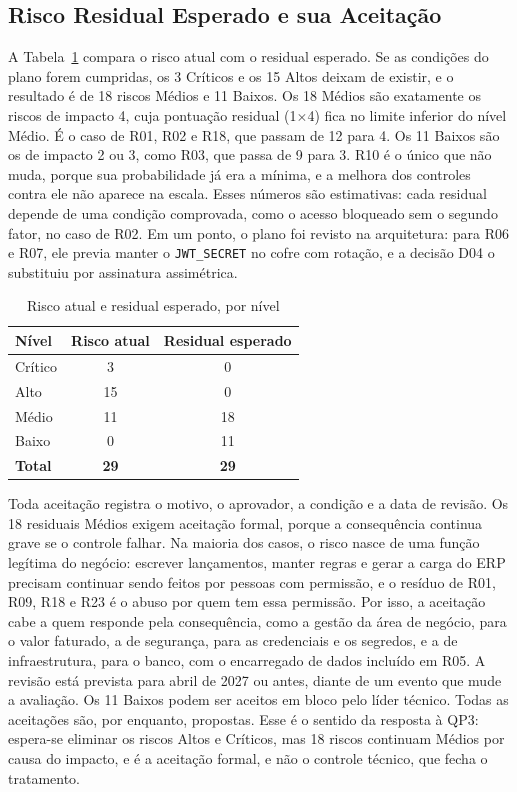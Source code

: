 \documentclass[conference]{IEEEtran}
\begin{document}
\subsection{Risco Residual Esperado e sua Aceitação}
\label{subsec:residual}
\label{subsec:aceitacao}

A Tabela~\ref{tab:residual} compara o risco atual com o residual esperado. Se as condições do plano forem cumpridas, os 3 Críticos e os 15 Altos deixam de existir, e o resultado é de 18 riscos Médios e 11 Baixos. Os 18 Médios são exatamente os riscos de impacto 4, cuja pontuação residual (1$\times$4) fica no limite inferior do nível Médio. É o caso de R01, R02 e R18, que passam de 12 para 4. Os 11 Baixos são os de impacto 2 ou 3, como R03, que passa de 9 para 3. R10 é o único que não muda, porque sua probabilidade já era a mínima, e a melhora dos controles contra ele não aparece na escala. Esses números são estimativas: cada residual depende de uma condição comprovada, como o acesso bloqueado sem o segundo fator, no caso de R02. Em um ponto, o plano foi revisto na arquitetura: para R06 e R07, ele previa manter o \texttt{JWT\_SECRET} no cofre com rotação, e a decisão D04 o substituiu por assinatura assimétrica.

\begin{table}[!t]
\centering
\caption{Risco atual e residual esperado, por nível}
\label{tab:residual}
\footnotesize
\renewcommand{\arraystretch}{1.15}
\begin{tabular}{@{}lcc@{}}
\hline
\textbf{Nível} & \textbf{Risco atual} & \textbf{Residual esperado} \\
\hline
Crítico & 3 & 0 \\
Alto & 15 & 0 \\
Médio & 11 & 18 \\
Baixo & 0 & 11 \\
\hline
\textbf{Total} & \textbf{29} & \textbf{29} \\
\hline
\end{tabular}
\end{table}

Toda aceitação registra o motivo, o aprovador, a condição e a data de revisão. Os 18 residuais Médios exigem aceitação formal, porque a consequência continua grave se o controle falhar. Na maioria dos casos, o risco nasce de uma função legítima do negócio: escrever lançamentos, manter regras e gerar a carga do ERP precisam continuar sendo feitos por pessoas com permissão, e o resíduo de R01, R09, R18 e R23 é o abuso por quem tem essa permissão. Por isso, a aceitação cabe a quem responde pela consequência, como a gestão da área de negócio, para o valor faturado, a de segurança, para as credenciais e os segredos, e a de infraestrutura, para o banco, com o encarregado de dados incluído em R05. A revisão está prevista para abril de 2027 ou antes, diante de um evento que mude a avaliação. Os 11 Baixos podem ser aceitos em bloco pelo líder técnico. Todas as aceitações são, por enquanto, propostas. Esse é o sentido da resposta à QP3: espera-se eliminar os riscos Altos e Críticos, mas 18 riscos continuam Médios por causa do impacto, e é a aceitação formal, e não o controle técnico, que fecha o tratamento.
\end{document}
